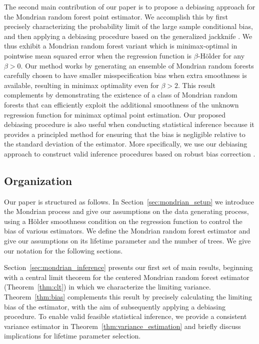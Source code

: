 The second main contribution of our paper is to propose a debiasing approach
for the Mondrian random forest point estimator. We accomplish this by first
precisely characterizing the probability limit of the large sample conditional
bias, and then applying a debiasing procedure based on the generalized
jackknife \citep{schucany1977improvement}. We thus exhibit a Mondrian random
forest variant which is minimax-optimal in pointwise mean squared error when
the regression function is $\beta$-H{\"o}lder for any $\beta > 0$. Our method
works by generating an ensemble of Mondrian random forests carefully chosen to
have smaller misspecification bias when extra smoothness is available,
resulting in minimax optimality even for $\beta > 2$. This result complements
\citet{mourtada2020minimax} by demonstrating the existence of a class of
Mondrian random forests that can efficiently exploit the additional smoothness
of the unknown regression function for minimax optimal point estimation. Our
proposed debiasing procedure is also useful when conducting statistical
inference because it provides a principled method for ensuring that the bias is
negligible relative to the standard deviation of the estimator. More
specifically, we use our debiasing approach to construct valid inference
procedures based on robust bias correction
\citep{calonico2018jasa,calonico2022bernoulli}.

\subsection{Organization}

Our paper is structured as follows. In Section~\ref{sec:mondrian_setup} we
introduce the Mondrian process and give our assumptions on the data generating
process, using a H{\"o}lder smoothness condition on the regression function to
control the bias of various estimators. We define the Mondrian random forest
estimator and give our assumptions on its lifetime parameter and the number of
trees. We give our notation for the following sections.

Section~\ref{sec:mondrian_inference} presents our first set of main results,
beginning with a central limit theorem for the centered Mondrian random forest
estimator (Theorem~\ref{thm:clt}) in which we characterize the limiting
variance. Theorem~\ref{thm:bias} complements this result by precisely
calculating the limiting bias of the estimator, with the aim of subsequently
applying a debiasing procedure. To enable valid feasible statistical inference,
we provide a consistent variance estimator in
Theorem~\ref{thm:variance_estimation} and briefly discuss implications for
lifetime parameter selection.

